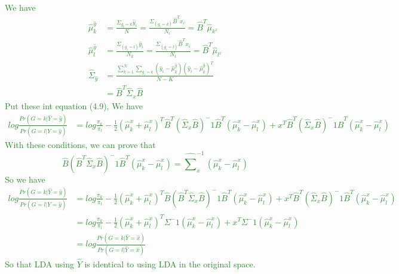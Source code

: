 \documentclass{article}
\begin{document}
\textcolor{ForestGreen}{We have \begin{align*}
      \hat \mu_{k}^{\hat y} &= \frac{\Sigma_{g_i=k} \hat y_i}{N}=  \frac{\Sigma_(g_i=k) \hat B^Tx_i}{N_i} = \hat B^T\hat \mu_{k^x} \\
      \hat \mu_{l}^{\hat y} &= \frac{\Sigma_(g_i=l) \hat y_i}{N_k} =  \frac{\Sigma_(g_i=l) \hat B^Tx_i}{N_i} = \hat B^T\hat \mu_{l^x} \\
      \hat \Sigma_{\hat y} &= \frac{\sum_{k=1}^{N} \sum_{g_i=k} \left(\hat y_i - \hat \mu_{k}^{\hat y}\right) \left(\hat y_i - \hat \mu_{k}^{\hat y}\right)^T}{N-K} \\
      &=\hat B^T\hat\Sigma_x\hat B
  \end{align*}
Put these int equation (4.9), We have \begin{align*}
      log \frac{Pr(G=k|\hat Y = \hat y)}{Pr(G=l|\hat Y = \hat y)} &= log \frac{\pi_k}{\pi_l} - \frac{1}{2}(\hat \mu_k^ x + \hat \mu_l^x)^T\hat B^T(\hat\Sigma_x\hat B)^-1 \hat B^T(\hat \mu_k^x - \hat \mu_l^x) + x^T\hat B^T(\hat\Sigma_x\hat B)^-1 \hat B^T(\hat \mu_k^x - \hat \mu_l^x)
  \end{align*}
  With these conditions, we can prove that \[
    \hat B(\hat B^T\hat\Sigma_x\hat B)^-1 \hat B^T(\hat \mu_k^x - \hat \mu_l^x) = \hat\sum_{x}^{-1}(\hat \mu_k^x - \hat \mu_l^x)
  \]
  So we have \begin{align*}
        log \frac{Pr(G=k|\hat Y = \hat y)}{Pr(G=l|\hat Y = \hat y)} &= log \frac{\pi_k}{\pi_l} - \frac{1}{2}(\hat \mu_k^ x + \hat \mu_l^x)^T\hat B(\hat B^T\hat\Sigma_x\hat B)^-1 \hat B^T(\hat \mu_k^x - \hat \mu_l^x) + x^T\hat B^T(\hat\Sigma_x\hat B)^-1 \hat B^T(\hat \mu_k^x - \hat \mu_l^x) \\
        &= log \frac{\pi_k}{\pi_l} - \frac{1}{2}(\hat \mu_k^ x + \hat \mu_l^x)^T\Sigma^-1(\hat \mu_k^x - \hat \mu_l^x) + x^T\Sigma^-1(\hat \mu_k^x - \hat \mu_l^x) \\
        &= log \frac{Pr(G=k|\hat Y = \hat x)}{Pr(G=l|\hat Y = \hat x)}
    \end{align*}
  So that LDA using $\hat Y$ is identical to using LDA in the original space.
}
\end{document}
